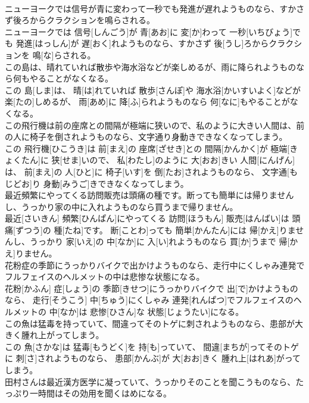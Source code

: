 \documentclass[8pt]{extreport}
\begin{document}
\begin{CJK}{UTF8}{min}
\\	ニューヨークでは信号が青に変わって一秒でも発進が遅れようものなら、すかさず後ろからクラクションを鳴らされる。	
\\	ニューヨークでは 信号[しんごう]が 青[あお]に 変[か]わって 一秒[いちびょう]でも 発進[はっしん]が 遅[おく]れようものなら、すかさず 後[うし]ろからクラクションを 鳴[な]らされる。
\\	この島は、晴れていれば散歩や海水浴などが楽しめるが、雨に降られようものなら何もやることがなくなる。	
\\	この 島[しま]は、 晴[は]れていれば 散歩[さんぽ]や 海水浴[かいすいよく]などが 楽[たの]しめるが、 雨[あめ]に 降[ふ]られようものなら 何[なに]もやることがなくなる。
\\	この飛行機は前の座席との間隔が極端に狭いので、私のように大きい人間は、前の人に椅子を倒されようものなら、文字通り身動きできなくなってしまう。	
\\	この 飛行機[ひこうき]は 前[まえ]の 座席[ざせき]との 間隔[かんかく]が 極端[きょくたん]に 狭[せま]いので、 私[わたし]のように 大[おお]きい 人間[にんげん]は、 前[まえ]の 人[ひと]に 椅子[いす]を 倒[たお]されようものなら、 文字通[もじどお]り 身動[みうご]きできなくなってしまう。
\\	最近頻繁にやってくる訪問販売は頭痛の種です。断っても簡単には帰りませんし、うっかり家の中に入れようものなら買うまで帰りません。	
\\	最近[さいきん] 頻繁[ひんぱん]にやってくる 訪問[ほうもん] 販売[はんばい]は 頭痛[ずつう]の 種[たね]です。 断[ことわ]っても 簡単[かんたん]には 帰[かえ]りませんし、うっかり 家[いえ]の 中[なか]に 入[い]れようものなら 買[か]うまで 帰[かえ]りません。
\\	花粉症の季節にうっかりバイクで出かけようものなら、走行中にくしゃみ連発でフルフェイスのヘルメットの中は悲惨な状態になる。	
\\	花粉[かふん] 症[しょう]の 季節[きせつ]にうっかりバイクで 出[で]かけようものなら、 走行[そうこう] 中[ちゅう]にくしゃみ 連発[れんぱつ]でフルフェイスのヘルメットの 中[なか]は 悲惨[ひさん]な 状態[じょうたい]になる。
\\	この魚は猛毒を持っていて、間違ってそのトゲに刺されようものなら、患部が大きく腫れ上がってしまう。	
\\	この 魚[さかな]は 猛毒[もうどく]を 持[も]っていて、 間違[まちが]ってそのトゲに 刺[さ]されようものなら、 患部[かんぶ]が 大[おお]きく 腫れ上[はれあ]がってしまう。
\\	田村さんは最近漢方医学に凝っていて、うっかりそのことを聞こうものなら、たっぷり一時間はその効用を聞くはめになる。	

\end{CJK}
\end{document}
